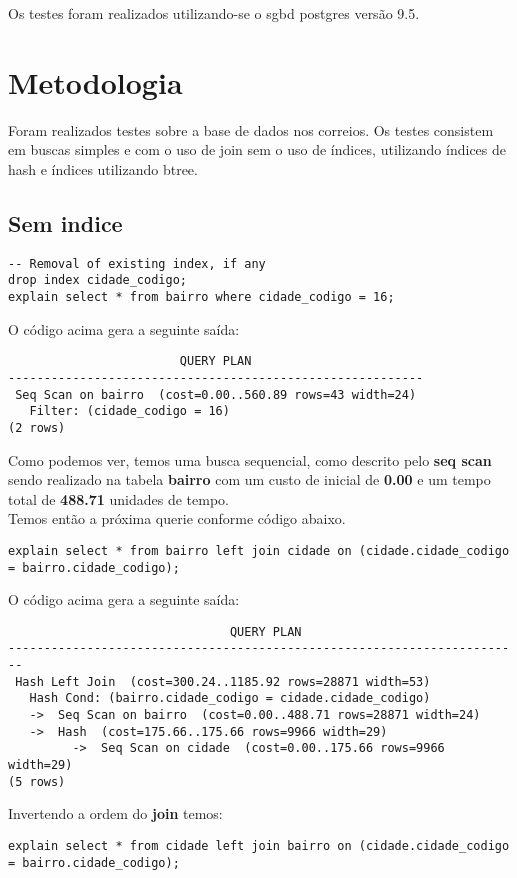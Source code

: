 \documentclass[12pt, a4paper, twoside, titlepage]{article}
\begin{document}
Os testes foram realizados utilizando-se o sgbd postgres versão 9.5.

\section{Metodologia} \label{documentclasses}
Foram realizados testes sobre a base de dados nos correios. Os testes consistem em buscas simples e com o uso de join sem o uso de índices, utilizando índices de hash e índices utilizando btree.
\clearpage
\subsection{Sem indice}
\begin{lstlisting}
-- Removal of existing index, if any 
drop index cidade_codigo;
explain select * from bairro where cidade_codigo = 16;
\end{lstlisting}
O código acima gera a seguinte saída: 
\begin{lstlisting}
                        QUERY PLAN
----------------------------------------------------------
 Seq Scan on bairro  (cost=0.00..560.89 rows=43 width=24)
   Filter: (cidade_codigo = 16)
(2 rows)
\end{lstlisting}
Como podemos ver, temos uma busca sequencial, como descrito pelo \textbf{seq scan} sendo realizado na tabela \textbf{bairro} com um custo de inicial de \textbf{0.00} e um tempo total de \textbf{488.71} unidades de tempo.
\\Temos então a próxima querie conforme código abaixo.
\begin{lstlisting}
explain select * from bairro left join cidade on (cidade.cidade_codigo = bairro.cidade_codigo);
\end{lstlisting}
O código acima gera a seguinte saída: 
\begin{lstlisting}
                               QUERY PLAN
------------------------------------------------------------------------
 Hash Left Join  (cost=300.24..1185.92 rows=28871 width=53)
   Hash Cond: (bairro.cidade_codigo = cidade.cidade_codigo)
   ->  Seq Scan on bairro  (cost=0.00..488.71 rows=28871 width=24)
   ->  Hash  (cost=175.66..175.66 rows=9966 width=29)
         ->  Seq Scan on cidade  (cost=0.00..175.66 rows=9966 width=29)
(5 rows)

\end{lstlisting}
Invertendo a ordem do \textbf{join} temos:
\begin{lstlisting}
explain select * from cidade left join bairro on (cidade.cidade_codigo = bairro.cidade_codigo);
\end{lstlisting}
\end{document}
